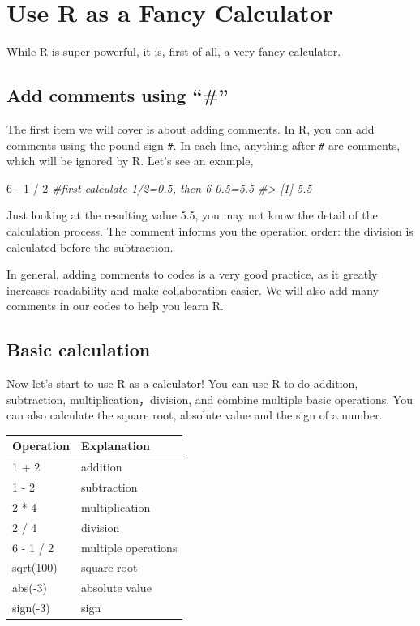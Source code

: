 \documentclass[
]{book}
\newenvironment{Shaded}{\begin{snugshade}}{\end{snugshade}}
\newcommand{\CommentTok}[1]{\textcolor[rgb]{0.56,0.35,0.01}{\textit{#1}}}
\newcommand{\DecValTok}[1]{\textcolor[rgb]{0.00,0.00,0.81}{#1}}
\newcommand{\SpecialCharTok}[1]{\textcolor[rgb]{0.00,0.00,0.00}{#1}}
\begin{document}
\hypertarget{Calculator}{%
\section{Use R as a Fancy Calculator}\label{Calculator}}

While R is super powerful, it is, first of all, a very fancy calculator.

\hypertarget{add-comments-using}{%
\subsection{Add comments using ``\#''}\label{add-comments-using}}

The first item we will cover is about adding comments. In R, you can add comments using the pound sign \texttt{\#}. In each line, anything after \texttt{\#} are comments, which will be ignored by R. Let's see an example,

\begin{Shaded}
\begin{Highlighting}[]
\DecValTok{6} \SpecialCharTok{{-}} \DecValTok{1} \SpecialCharTok{/} \DecValTok{2} \CommentTok{\#first calculate 1/2=0.5, then 6{-}0.5=5.5}
\CommentTok{\#\textgreater{} [1] 5.5}
\end{Highlighting}
\end{Shaded}

Just looking at the resulting value 5.5, you may not know the detail of the calculation process. The comment informs you the operation order: the division is calculated before the subtraction.

In general, adding comments to codes is a very good practice, as it greatly increases readability and make collaboration easier. We will also add many comments in our codes to help you learn R.

\hypertarget{basic-calculation}{%
\subsection{Basic calculation}\label{basic-calculation}}

Now let's start to use R as a calculator! You can use R to do addition, subtraction, multiplication，division, and combine multiple basic operations. You can also calculate the square root, absolute value and the sign of a number.

\begin{tabular}{l|l}
\hline
Operation & Explanation\\
\hline
1 + 2 & addition\\
\hline
1 - 2 & subtraction\\
\hline
2 * 4 & multiplication\\
\hline
2 / 4 & division\\
\hline
6 - 1 / 2 & multiple operations\\
\hline
sqrt(100) & square root\\
\hline
abs(-3) & absolute value\\
\hline
sign(-3) & sign\\
\hline
\end{tabular}
\end{document}
